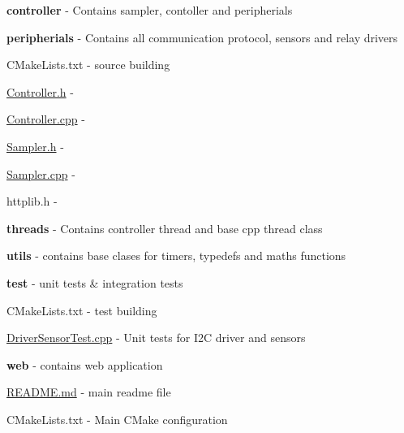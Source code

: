 \begin{DoxyItemize}
\begin{DoxyItemize}
\begin{DoxyItemize}
\begin{DoxyItemize}
\item {\bfseries controller} -\/ Contains sampler, contoller and peripherials
\begin{DoxyItemize}
\item {\bfseries peripherials} -\/ Contains all communication protocol, sensors and relay drivers
\begin{DoxyItemize}
\item C\+Make\+Lists.\+txt -\/ source building
\end{DoxyItemize}
\item \hyperlink{Controller_8h}{Controller.\+h} -\/
\item \hyperlink{Controller_8cpp}{Controller.\+cpp} -\/
\item \hyperlink{Sampler_8h}{Sampler.\+h} -\/
\item \hyperlink{Sampler_8cpp}{Sampler.\+cpp} -\/
\item httplib.\+h -\/
\end{DoxyItemize}
\item {\bfseries threads} -\/ Contains controller thread and base cpp thread class
\item {\bfseries utils} -\/ contains base clases for timers, typedefs and maths functions
\end{DoxyItemize}
\item {\bfseries test} -\/ unit tests \& integration tests
\begin{DoxyItemize}
\item C\+Make\+Lists.\+txt -\/ test building
\item \hyperlink{DriverSensorTest_8cpp}{Driver\+Sensor\+Test.\+cpp} -\/ Unit tests for I2C driver and sensors
\end{DoxyItemize}
\item {\bfseries web} -\/ contains web application
\end{DoxyItemize}
\item \hyperlink{README_8md}{R\+E\+A\+D\+M\+E.\+md} -\/ main readme file
\item C\+Make\+Lists.\+txt -\/ Main C\+Make configuration 
\end{DoxyItemize}
\end{DoxyItemize}